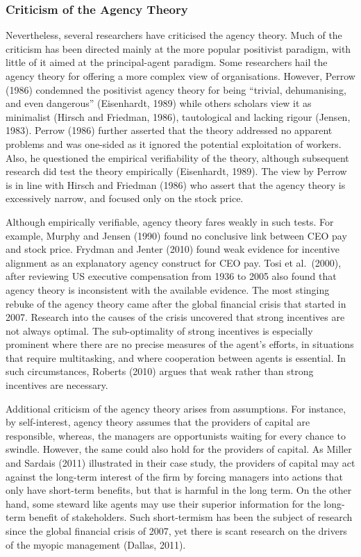 \documentclass[a4paper, nobind]{templates/ociamthesis}
\begin{document}
\hypertarget{criticism-of-the-agency-theory}{%
\subsubsection{Criticism of the Agency Theory}\label{criticism-of-the-agency-theory}}

Nevertheless, several researchers have criticised the agency theory. Much of the criticism has been directed mainly at the more popular positivist paradigm, with little of it aimed at the principal-agent paradigm. Some researchers hail the agency theory for offering a more complex view of organisations. However, Perrow (1986) condemned the positivist agency theory for being ``trivial, dehumanising, and even dangerous'' (Eisenhardt, 1989) while others scholars view it as minimalist (Hirsch and Friedman, 1986), tautological and lacking rigour (Jensen, 1983). Perrow (1986) further asserted that the theory addressed no apparent problems and was one-sided as it ignored the potential exploitation of workers. Also, he questioned the empirical verifiability of the theory, although subsequent research did test the theory empirically (Eisenhardt, 1989). The view by Perrow is in line with Hirsch and Friedman (1986) who assert that the agency theory is excessively narrow, and focused only on the stock price.

Although empirically verifiable, agency theory fares weakly in such tests. For example, Murphy and Jensen (1990) found no conclusive link between CEO pay and stock price. Frydman and Jenter (2010) found weak evidence for incentive alignment as an explanatory agency construct for CEO pay. Tosi et al.~(2000), after reviewing US executive compensation from 1936 to 2005 also found that agency theory is inconsistent with the available evidence. The most stinging rebuke of the agency theory came after the global financial crisis that started in 2007. Research into the causes of the crisis uncovered that strong incentives are not always optimal. The sub-optimality of strong incentives is especially prominent where there are no precise measures of the agent's efforts, in situations that require multitasking, and where cooperation between agents is essential. In such circumstances, Roberts (2010) argues that weak rather than strong incentives are necessary.

Additional criticism of the agency theory arises from assumptions. For instance, by self-interest, agency theory assumes that the providers of capital are responsible, whereas, the managers are opportunists waiting for every chance to swindle. However, the same could also hold for the providers of capital. As Miller and Sardais (2011) illustrated in their case study, the providers of capital may act against the long-term interest of the firm by forcing managers into actions that only have short-term benefits, but that is harmful in the long term. On the other hand, some steward like agents may use their superior information for the long-term benefit of stakeholders. Such short-termism has been the subject of research since the global financial crisis of 2007, yet there is scant research on the drivers of the myopic management (Dallas, 2011).
\end{document}

